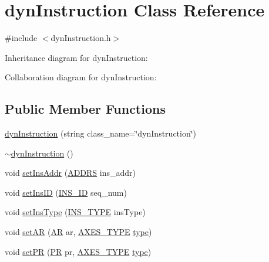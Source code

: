 \hypertarget{classdynInstruction}{
\section{dynInstruction Class Reference}
\label{classdynInstruction}
}


{\ttfamily \#include $<$dynInstruction.h$>$}



Inheritance diagram for dynInstruction:


Collaboration diagram for dynInstruction:
\subsection*{Public Member Functions}
\begin{DoxyCompactItemize}
\item 
\hyperlink{classdynInstruction_a8a1f30fc17d64e9bea312210603dd778}{dynInstruction} (string class\_\-name=\char`\"{}dynInstruction\char`\"{})
\item 
\hyperlink{classdynInstruction_a133d35bbe8cd2afdf8f7c9618beb3759}{$\sim$dynInstruction} ()
\item 
void \hyperlink{classdynInstruction_a7e3e916d80cc3cb1bbd7cdf6524e9983}{setInsAddr} (\hyperlink{binaryTranslator_2frontend_2stInstruction_8h_a7ea74bb9ffd2e4d41550ae2383dd25bc}{ADDRS} ins\_\-addr)
\item 
void \hyperlink{classdynInstruction_a6f7d683f2db0f9c0a0272128278b4fa3}{setInsID} (\hyperlink{global_2global_8h_a1883c47d0023d0f200e1d86eced6a070}{INS\_\-ID} seq\_\-num)
\item 
void \hyperlink{classdynInstruction_ae7c165e2f688432713ea575b2a5477fe}{setInsType} (\hyperlink{binaryTranslator_2global_8h_a7aead736a07eaf25623ad7bfa1f0ee2d}{INS\_\-TYPE} insType)
\item 
void \hyperlink{classdynInstruction_a27b7ba0720a85d516c3885bddf154765}{setAR} (\hyperlink{global_2global_8h_a735ca3cb7fa17e60af6701a846722516}{AR} ar, \hyperlink{binaryTranslator_2global_8h_a94b8423a23b95a7adac22848b81e7c0c}{AXES\_\-TYPE} \hyperlink{binaryTranslator_2global_8h_a7aead736a07eaf25623ad7bfa1f0ee2d}{type})
\item 
void \hyperlink{classdynInstruction_a86ac41fe463dde2aee30a22d8bc243ad}{setPR} (\hyperlink{global_2global_8h_a54dcae2ba04c76c12afe113b706bd4dc}{PR} pr, \hyperlink{binaryTranslator_2global_8h_a94b8423a23b95a7adac22848b81e7c0c}{AXES\_\-TYPE} \hyperlink{binaryTranslator_2global_8h_a7aead736a07eaf25623ad7bfa1f0ee2d}{type})

\end{DoxyCompactItemize}
